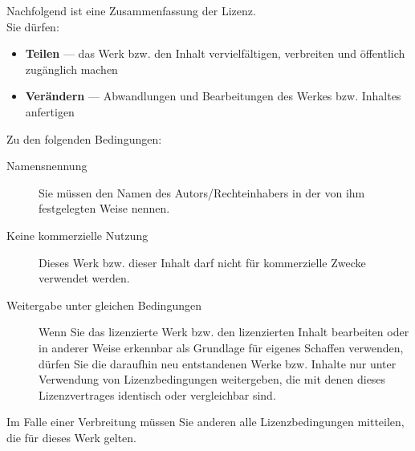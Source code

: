 \noindent
Nachfolgend ist eine Zusammenfassung der Lizenz.\\

\noindent
Sie dürfen:
\begin{itemize}
 \item \textbf{Teilen} — das Werk bzw. den Inhalt vervielfältigen, verbreiten und öffentlich zugänglich machen 
 \item \textbf{Verändern} — Abwandlungen und Bearbeitungen des Werkes bzw. Inhaltes anfertigen
\end{itemize}
\noindent
Zu den folgenden Bedingungen:
\begin{description}
 \item[Namensnennung] Sie müssen den Namen des Autors/Rechteinhabers in der von ihm festgelegten Weise nennen.
 \item[Keine kommerzielle Nutzung] Dieses Werk bzw. dieser Inhalt darf nicht für kommerzielle Zwecke verwendet werden.
 \item[Weitergabe unter gleichen Bedingungen] Wenn Sie das lizenzierte Werk bzw. den lizenzierten Inhalt bearbeiten oder in anderer Weise erkennbar als Grundlage für eigenes Schaffen verwenden, dürfen Sie die daraufhin neu entstandenen Werke bzw. Inhalte nur unter Verwendung von Lizenzbedingungen weitergeben, die mit denen dieses Lizenzvertrages identisch oder vergleichbar sind.
\end{description}

\noindent
Im Falle einer Verbreitung müssen Sie anderen alle Lizenzbedingungen mitteilen, die für dieses Werk gelten.\\

